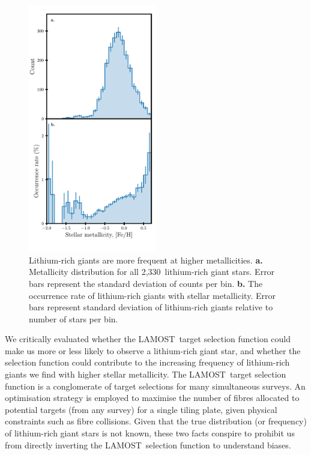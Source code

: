 \documentclass[twocolumn]{aastex62}
\newcommand{\SampleSize}{2,330}
\newcommand\lamost{LAMOST}
\begin{document}
\begin{figure}
	\centering
	\includegraphics[width=0.5\textwidth]{fraction_wrt_mh}
	\caption{
		Lithium-rich giants are more frequent at higher metallicities.
		\textbf{a.} Metallicity distribution for all
		\SampleSize\ lithium-rich giant stars. Error bars represent the standard deviation of counts per bin.
		\textbf{b.} The occurrence 
		rate of lithium-rich giants with stellar metallicity. Error bars represent standard deviation of lithium-rich giants relative to number of stars per bin.}
	\label{fig:mdf_frequency}
\end{figure} 


We critically evaluated whether the \lamost\ target selection function could 
make us more or less likely to observe a lithium-rich giant star, and whether
the selection function could contribute to the increasing frequency of lithium-rich
giants we find with higher stellar metallicity. The \lamost\ target selection function
is a conglomerate of target selections for many simultaneous surveys. An
optimisation strategy is employed to maximise the number of fibres allocated
to potential targets (from any survey) for a single tiling plate, given physical
constraints such as fibre collisions. Given that the true distribution (or 
frequency) of lithium-rich giant stars is not known, these two facts conspire 
to prohibit us from directly inverting the \lamost\ selection function to 
understand biases. 
\end{document}
